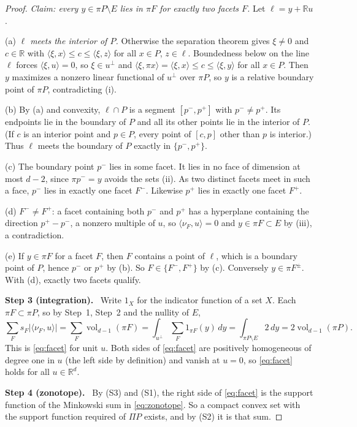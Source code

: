 \documentclass[11pt]{article}
\newcommand{\R}{\mathbb R}
\DeclareMathOperator{\vol}{vol}
\newcommand{\step}[1]{\par\smallskip\noindent\textbf{#1}\ }
\begin{document}
\begin{proof}
\emph{Claim: every \(y\in\pi P\setminus E\) lies in \(\pi F\) for
exactly two facets \(F\).} Let \(\ell=y+\R u\).

(a) \emph{\(\ell\) meets the interior of \(P\).} Otherwise the
separation theorem gives \(\xi\ne0\) and \(c\in\R\) with
\(\langle\xi,x\rangle\le c\le\langle\xi,z\rangle\) for all \(x\in P\),
\(z\in\ell\). Boundedness below on the line \(\ell\) forces
\(\langle\xi,u\rangle=0\), so \(\xi\in u^\perp\) and
\(\langle\xi,\pi x\rangle=\langle\xi,x\rangle\le c\le\langle\xi,y\rangle\)
for all \(x\in P\). Then \(y\) maximizes a nonzero linear functional of
\(u^\perp\) over \(\pi P\), so \(y\) is a relative boundary point of
\(\pi P\), contradicting (i).

(b) By (a) and convexity, \(\ell\cap P\) is a segment \([p^-,p^+]\)
with \(p^-\ne p^+\). Its endpoints lie in the boundary of \(P\) and all
its other points lie in the interior of \(P\). (If \(c\) is an interior
point and \(p\in P\), every point of \([c,p]\) other than \(p\) is
interior.) Thus \(\ell\) meets the boundary of \(P\) exactly in
\(\{p^-,p^+\}\).

(c) The boundary point \(p^-\) lies in some facet. It lies in no face
of dimension at most \(d-2\), since \(\pi p^-=y\) avoids the sets (ii).
As two distinct facets meet in such a face, \(p^-\) lies in exactly one
facet \(F^-\). Likewise \(p^+\) lies in exactly one facet \(F^+\).

(d) \(F^-\ne F^+\): a facet containing both \(p^-\) and \(p^+\) has a
hyperplane containing the direction \(p^+-p^-\), a nonzero multiple of
\(u\), so \(\langle\nu_F,u\rangle=0\) and \(y\in\pi F\subset E\) by
(iii), a contradiction.

(e) If \(y\in\pi F\) for a facet \(F\), then \(F\) contains a point of
\(\ell\), which is a boundary point of \(P\), hence \(p^-\) or \(p^+\)
by (b). So \(F\in\{F^-,F^+\}\) by (c). Conversely \(y\in\pi F^\pm\).
With (d), exactly two facets qualify.

\step{Step 3 (integration).} Write \(1_X\) for the indicator function
of a set \(X\). Each \(\pi F\subset\pi P\), so by Step~1, Step~2 and
the nullity of \(E\),
\[
 \sum_Fs_F|\langle\nu_F,u\rangle|
 =\sum_F\vol_{d-1}(\pi F)
 =\int_{u^\perp}\sum_F1_{\pi F}(y)\,dy
 =\int_{\pi P\setminus E}2\,dy
 =2\vol_{d-1}(\pi P).
\]
This is \eqref{eq:facet} for unit \(u\). Both sides of
\eqref{eq:facet} are positively homogeneous of degree one in \(u\) (the
left side by definition) and vanish at \(u=0\), so \eqref{eq:facet}
holds for all \(u\in\R^d\).

\step{Step 4 (zonotope).} By (S3) and (S1), the right side of
\eqref{eq:facet} is the support function of the Minkowski sum in
\eqref{eq:zonotope}. So a compact convex set with the support function
required of \(\Pi P\) exists, and by (S2) it is that sum.
\end{proof}
\end{document}
